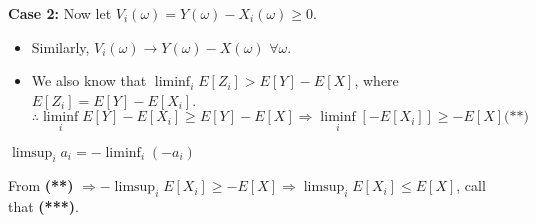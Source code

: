 \textbf{Case 2:} Now let $V_i(\omega) = Y(\omega) - X_i(\omega) \geq 0$.
\begin{itemize}
    \item Similarly, $V_i(\omega) \rightarrow Y(\omega) - X(\omega)$ $\forall \omega$.
    \item We also know that $\liminf_i E[Z_i] > E[Y] - E[X]$, where $E[Z_i] = E[Y] - E[X_i]$.
    \begin{equation*}
        \therefore \liminf_i E[Y] - E[X_i] \geq E[Y] - E[X] \Rightarrow \liminf_i [-E[X_i]] \geq -E[X] \textbf{(**)}
    \end{equation*}
\end{itemize}

\begin{rem}
    $\limsup_ia_i = -\liminf_i(-a_i)$
\end{rem}

From \textbf{(**)} $\Rightarrow -\limsup_i E[X_i] \geq -E[X] \Rightarrow \limsup_iE[X_i] \leq E[X]$, call that \textbf{(***)}.


